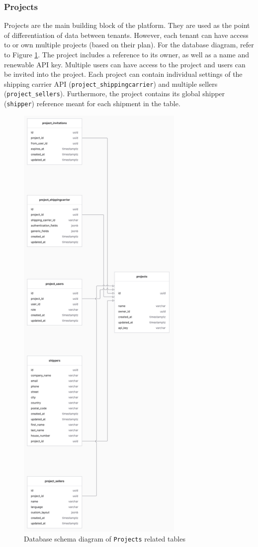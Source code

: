 \subsubsection{Projects}
Projects are the main building block of the platform.
They are used as the point of differentiation of data between tenants.
However, each tenant can have access to or own multiple projects (based on their plan).
For the database diagram, refer to Figure \ref{imgdocs:db-schema-projects}.
The project includes a reference to its owner, as well as a name and renewable API key. 
Multiple users can have access to the project and users can be invited into the project.
Each project can contain individual settings of the shipping carrier API (\texttt{project\_shippingcarrier}) and multiple sellers (\texttt{project\_sellers}).
Furthermore, the project contains its global shipper (\texttt{shipper}) reference meant for each shipment in the table.

\begin{figure}[H]\centering
\includegraphics[width=80mm]{img/docs/fig_db_schema_projects.png}
\caption{Database schema diagram of \texttt{Projects} related tables}
\label{imgdocs:db-schema-projects}
\end{figure}

